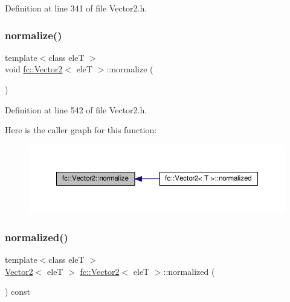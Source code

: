 Definition at line 341 of file Vector2.\+h.

\mbox{\label{classfc_1_1Vector2_a5d08f50cf4fbb34744a0c31ad9b591e6}} 
\subsubsection{\texorpdfstring{normalize()}{normalize()}}
{\footnotesize\ttfamily template$<$class eleT $>$ \\
void \hyperlink{classfc_1_1Vector2}{fc\+::\+Vector2}$<$ eleT $>$\+::normalize (\begin{DoxyParamCaption}{ }\end{DoxyParamCaption})}



Definition at line 542 of file Vector2.\+h.

Here is the caller graph for this function\+:
\nopagebreak
\begin{figure}[H]
\begin{center}
\leavevmode
\includegraphics[width=350pt]{d9/d08/classfc_1_1Vector2_a5d08f50cf4fbb34744a0c31ad9b591e6_icgraph}
\end{center}
\end{figure}
\mbox{\label{classfc_1_1Vector2_a567f189a7a5f7871f0648d241e81f7ee}} 
\subsubsection{\texorpdfstring{normalized()}{normalized()}}
{\footnotesize\ttfamily template$<$class eleT $>$ \\
\hyperlink{classfc_1_1Vector2}{Vector2}$<$ eleT $>$ \hyperlink{classfc_1_1Vector2}{fc\+::\+Vector2}$<$ eleT $>$\+::normalized (\begin{DoxyParamCaption}{ }\end{DoxyParamCaption}) const}



